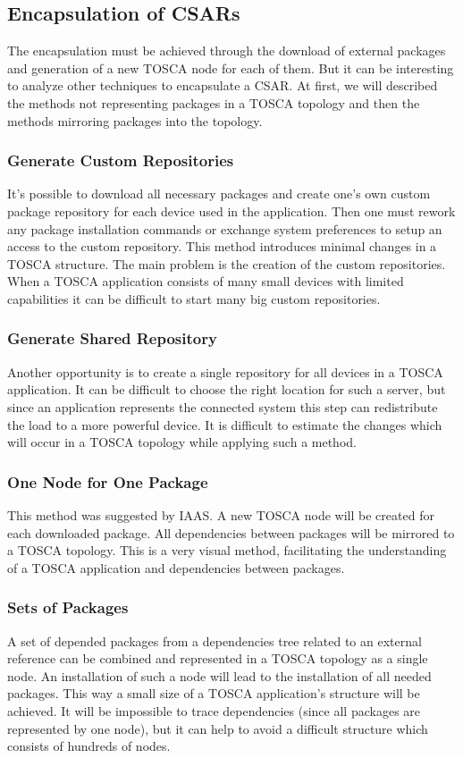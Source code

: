 \subsection*{Encapsulation of CSARs}
The encapsulation must be achieved through the download of external packages and generation of a new TOSCA node for each of them. 
But it can be interesting to analyze other techniques to encapsulate a CSAR. 
At first, we will described the methods not representing packages in a TOSCA topology and then the methods mirroring packages into the topology.\\
\subsubsection*{Generate Custom Repositories}
It's possible to download all necessary packages and create one's own custom package repository for each device used in the application. 
Then one must rework any package installation commands or exchange system preferences to setup an access to the custom repository.
This method introduces minimal changes in a TOSCA structure.
The main problem is the creation of the custom repositories. 
When a TOSCA application consists of many small devices with limited capabilities it can be difficult to start many big custom repositories.\\
\subsubsection*{Generate Shared Repository}
Another opportunity is to create a single repository for all devices in a TOSCA application.
It can be difficult to choose the right location for such a server, but since an application represents the connected system this step can redistribute the load to a more powerful device.
It is difficult to estimate the changes which will occur in a TOSCA topology while applying such a method.\\
\subsubsection*{One Node for One Package}
This method was suggested by IAAS. 
A new TOSCA node will be created for each downloaded package. 
All dependencies between packages will be mirrored to a TOSCA topology.
This is a very visual method, facilitating the understanding of a TOSCA application and dependencies between packages.\\
\subsubsection*{Sets of Packages} \label{mode:setsofpkg}
A set of depended packages from a dependencies tree related to an external reference can be combined and represented in a TOSCA topology as a single node.
An installation of such a node will lead to the installation of all needed packages.
This way a small size of a TOSCA application's structure will be achieved.
It will be impossible to trace dependencies (since all packages are represented by one node), but it can help to avoid a difficult structure which consists of hundreds of nodes. \\
